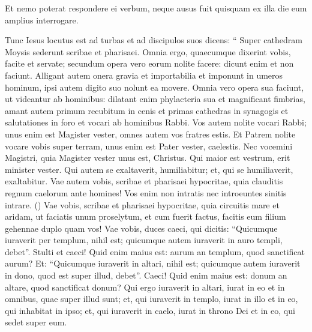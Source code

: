 \begin{biblechapter}
\begin{biblechapter}
\begin{biblechapter}
\begin{biblechapter}
\begin{biblechapter}
\begin{biblechapter}
\begin{biblechapter}
\begin{biblechapter}
\begin{biblechapter}
\begin{biblechapter}
\begin{biblechapter}
\begin{biblechapter}
\begin{biblechapter}
\begin{biblechapter}
\begin{biblechapter}
\begin{biblechapter}
\begin{biblechapter}
\begin{biblechapter}
\begin{biblechapter}
\begin{biblechapter}
\begin{biblechapter}
\begin{biblechapter}
\verse Et nemo poterat respondere ei verbum, neque ausus fuit quisquam ex illa die eum amplius interrogare.
 
\begin{biblechapter}
\verse Tunc Iesus locutus est ad turbas et ad discipulos suos 
\verse dicens: “ Super cathedram Moysis sederunt scribae et pharisaei. 
\verse Omnia ergo, quaecumque dixerint vobis, facite et servate; secundum opera vero eorum nolite facere: dicunt enim et non faciunt. 
\verse Alligant autem onera gravia et importabilia et imponunt in umeros hominum, ipsi autem digito suo nolunt ea movere. 
\verse Omnia vero opera sua faciunt, ut videantur ab hominibus: dilatant enim phylacteria sua et magnificant fimbrias, 
\verse amant autem primum recubitum in cenis et primas cathedras in synagogis 
\verse et salutationes in foro et vocari ab hominibus Rabbi. 
\verse Vos autem nolite vocari Rabbi; unus enim est Magister vester, omnes autem vos fratres estis. 
\verse Et Patrem nolite vocare vobis super terram, unus enim est Pater vester, caelestis. 
\verse Nec vocemini Magistri, quia Magister vester unus est, Christus. 
\verse Qui maior est vestrum, erit minister vester. 
\verse Qui autem se exaltaverit, humiliabitur; et, qui se humiliaverit, exaltabitur.
 \verse Vae autem vobis, scribae et pharisaei hypocritae, quia clauditis regnum caelorum ante homines! Vos
 enim non intratis nec introeuntes sinitis intrare. 
(\verse) \verse Vae vobis, scribae et pharisaei hypocritae, quia circuitis mare et aridam, ut faciatis unum proselytum, et cum fuerit factus, facitis eum filium gehennae duplo quam vos!
 \verse Vae vobis, duces caeci, qui dicitis: “Quicumque iuraverit per templum, nihil est; quicumque autem iuraverit in auro templi, debet”. 
\verse Stulti et caeci! Quid enim maius est: aurum an templum, quod sanctificat aurum? 
\verse Et: “Quicumque iuraverit in altari, nihil est; quicumque autem iuraverit in dono, quod est super illud, debet”. 
\verse Caeci! Quid enim maius est: donum an altare, quod sanctificat donum? 
\verse Qui ergo iuraverit in altari, iurat in eo et in omnibus, quae super illud sunt; 
\verse et, qui iuraverit in templo, iurat in illo et in eo, qui inhabitat in ipso; 
\verse et, qui iuraverit in caelo, iurat in throno Dei et in eo, qui sedet super eum.

\end{biblechapter}
\end{biblechapter}
\end{biblechapter}
\end{biblechapter}
\end{biblechapter}
\end{biblechapter}
\end{biblechapter}
\end{biblechapter}
\end{biblechapter}
\end{biblechapter}
\end{biblechapter}
\end{biblechapter}
\end{biblechapter}
\end{biblechapter}
\end{biblechapter}
\end{biblechapter}
\end{biblechapter}
\end{biblechapter}
\end{biblechapter}
\end{biblechapter}
\end{biblechapter}
\end{biblechapter}
\end{biblechapter}

